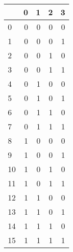 \begin{tabular}{lrrrr}
\toprule
 & 0 & 1 & 2 & 3 \\
\midrule
0 & 0 & 0 & 0 & 0 \\
1 & 0 & 0 & 0 & 1 \\
2 & 0 & 0 & 1 & 0 \\
3 & 0 & 0 & 1 & 1 \\
4 & 0 & 1 & 0 & 0 \\
5 & 0 & 1 & 0 & 1 \\
6 & 0 & 1 & 1 & 0 \\
7 & 0 & 1 & 1 & 1 \\
8 & 1 & 0 & 0 & 0 \\
9 & 1 & 0 & 0 & 1 \\
10 & 1 & 0 & 1 & 0 \\
11 & 1 & 0 & 1 & 1 \\
12 & 1 & 1 & 0 & 0 \\
13 & 1 & 1 & 0 & 1 \\
14 & 1 & 1 & 1 & 0 \\
15 & 1 & 1 & 1 & 1 \\
\bottomrule
\end{tabular}
